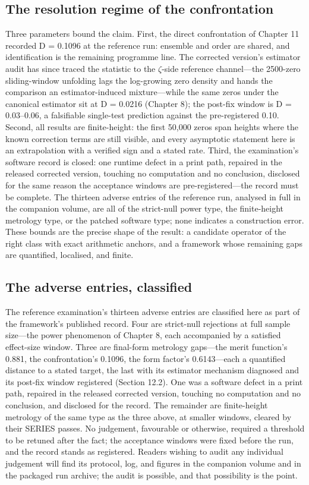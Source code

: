 \documentclass[10pt]{article}
\begin{document}
\subsection{The resolution regime of the confrontation}\label{sec:122}
Three parameters bound the claim. First, the direct confrontation of Chapter 11 recorded D = 0.1096 at the reference run: ensemble and order are shared, and identification is the remaining programme line. The corrected version's estimator audit has since traced the statistic to the $\zeta$-side reference channel---the 2500-zero sliding-window unfolding lags the log-growing zero density and hands the comparison an estimator-induced mixture---while the same zeros under the canonical estimator sit at D = 0.0216 (Chapter 8); the post-fix window is D = 0.03--0.06, a falsifiable single-test prediction against the pre-registered 0.10. Second, all results are finite-height: the first 50,000 zeros span heights where the known correction terms are still visible, and every asymptotic statement here is an extrapolation with a verified sign and a stated rate. Third, the examination's software record is closed: one runtime defect in a print path, repaired in the released corrected version, touching no computation and no conclusion, disclosed for the same reason the acceptance windows are pre-registered---the record must be complete. The thirteen adverse entries of the reference run, analysed in full in the companion volume, are all of the strict-null power type, the finite-height metrology type, or the patched software type; none indicates a construction error. These bounds are the precise shape of the result: a candidate operator of the right class with exact arithmetic anchors, and a framework whose remaining gaps are quantified, localised, and finite.

\subsection{The adverse entries, classified}\label{sec:123}
The reference examination's thirteen adverse entries are classified here as part of the framework's published record. Four are strict-null rejections at full sample size---the power phenomenon of Chapter 8, each accompanied by a satisfied effect-size window. Three are final-form metrology gaps---the merit function's 0.881, the confrontation's 0.1096, the form factor's 0.6143---each a quantified distance to a stated target, the last with its estimator mechanism diagnosed and its post-fix window registered (Section 12.2). One was a software defect in a print path, repaired in the released corrected version, touching no computation and no conclusion, and disclosed for the record. The remainder are finite-height metrology of the same type as the three above, at smaller windows, cleared by their SERIES passes. No judgement, favourable or otherwise, required a threshold to be retuned after the fact; the acceptance windows were fixed before the run, and the record stands as registered. Readers wishing to audit any individual judgement will find its protocol, log, and figures in the companion volume and in the packaged run archive; the audit is possible, and that possibility is the point.
\end{document}
